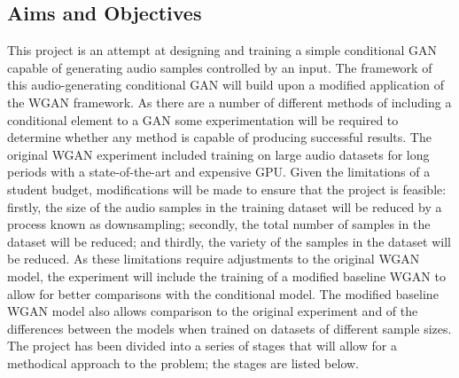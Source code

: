 \documentclass[a4paper, titlepage]{article}
\begin{document}
\subsection{Aims and Objectives}

This project is an attempt at designing and training a simple conditional \ac{GAN} capable of generating audio samples controlled by an input.
The framework of this audio-generating conditional \ac{GAN} will build upon a modified application of the \ac{WGAN} framework.
As there are a number of different methods of including a conditional element to a \ac{GAN} some experimentation will be required to determine whether any method is capable of producing successful results.
\newline
\newline
The original \ac{WGAN} experiment included training on large audio datasets for long periods with a state-of-the-art and expensive \ac{GPU}.
Given the limitations of a student budget, modifications will be made to ensure that the project is feasible: firstly, the size of the audio samples in the training dataset will be reduced by a process known as downsampling; secondly, the total number of samples in the dataset will be reduced; and thirdly, the variety of the samples in the dataset will be reduced.
\newline
\newline
As these limitations require adjustments to the original \ac{WGAN} model, the experiment will include the training of a modified baseline \ac{WGAN} to allow for better comparisons with the conditional model.
The modified baseline \ac{WGAN} model also allows comparison to the original experiment and of the differences between the models when trained on datasets of different sample sizes.
\newline
\newline
The project has been divided into a series of stages that will allow for a methodical approach to the problem; the stages are listed below.
\newline
\end{document}
